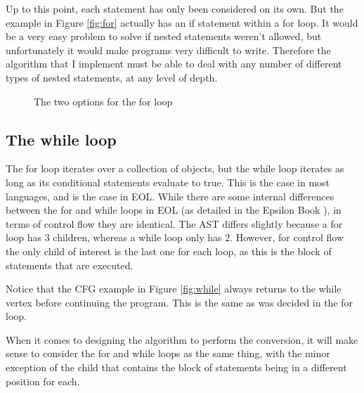 Up to this point, each statement has only been considered on its own. But the example in Figure \ref{fig:for} actually has an if statement within a for loop. It would be a very easy problem to solve if nested statements weren't allowed, but unfortunately it would make programs very difficult to write. Therefore the algorithm that I implement must be able to deal with any number of different types of nested statements, at any level of depth.

\begin{figure}
\centering
\begin{minipage}{.3\textwidth}
  \centering
\end{minipage}
\begin{minipage}{.3\textwidth}
  \centering
\end{minipage}
\caption{The two options for the for loop}
\label{fig:forOptions}
\end{figure}

\subsection{The while loop}

The for loop iterates over a collection of objects, but the while loop iterates as long as its conditional statements evaluate to true. This is the case in most languages, and is the case in EOL. While there are some internal differences between the for and while loops in EOL (as detailed in the Epsilon Book \citep{epsilonBook}), in terms of control flow they are identical. The AST differs slightly because a for loop has 3 children, whereas a while loop only has 2. However, for control flow the only child of interest is the last one for each loop, as this is the block of statements that are executed.

Notice that the CFG example in Figure \ref{fig:while} always returns to the while vertex before continuing the program. This is the same as was decided in the for loop.

When it comes to designing the algorithm to perform the conversion, it will make sense to consider the for and while loops as the same thing, with the minor exception of the child that contains the block of statements being in a different position for each.

